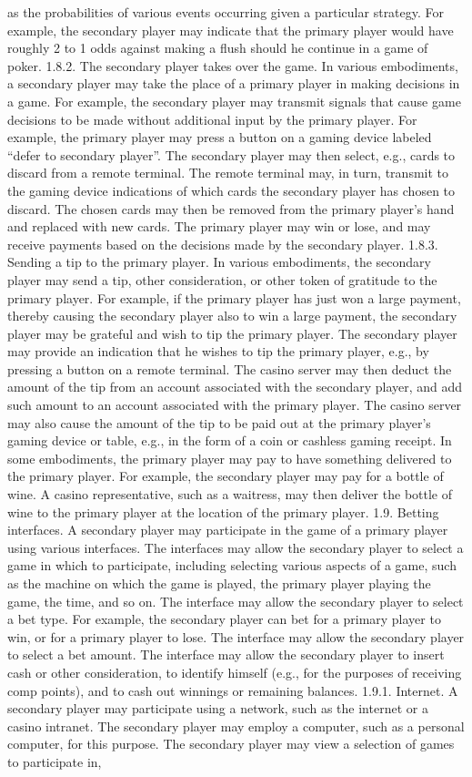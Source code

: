 \documentclass[11pt,a4paper]{article}
\begin{document}
as the probabilities of various events occurring given a particular strategy. For example, the secondary player may indicate that the primary player would have roughly 2 to 1 odds against making a flush should he continue in a game of poker. 1.8.2. The secondary player takes over the game. In various embodiments, a secondary player may take the place of a primary player in making decisions in a game. For example, the secondary player may transmit signals that cause game decisions to be made without additional input by the primary player. For example, the primary player may press a button on a gaming device labeled “defer to secondary player”. The secondary player may then select, e.g., cards to discard from a remote terminal. The remote terminal may, in turn, transmit to the gaming device indications of which cards the secondary player has chosen to discard. The chosen cards may then be removed from the primary player's hand and replaced with new cards. The primary player may win or lose, and may receive payments based on the decisions made by the secondary player. 1.8.3. Sending a tip to the primary player. In various embodiments, the secondary player may send a tip, other consideration, or other token of gratitude to the primary player. For example, if the primary player has just won a large payment, thereby causing the secondary player also to win a large payment, the secondary player may be grateful and wish to tip the primary player. The secondary player may provide an indication that he wishes to tip the primary player, e.g., by pressing a button on a remote terminal. The casino server may then deduct the amount of the tip from an account associated with the secondary player, and add such amount to an account associated with the primary player. The casino server may also cause the amount of the tip to be paid out at the primary player's gaming device or table, e.g., in the form of a coin or cashless gaming receipt. In some embodiments, the primary player may pay to have something delivered to the primary player. For example, the secondary player may pay for a bottle of wine. A casino representative, such as a waitress, may then deliver the bottle of wine to the primary player at the location of the primary player. 1.9. Betting interfaces. A secondary player may participate in the game of a primary player using various interfaces. The interfaces may allow the secondary player to select a game in which to participate, including selecting various aspects of a game, such as the machine on which the game is played, the primary player playing the game, the time, and so on. The interface may allow the secondary player to select a bet type. For example, the secondary player can bet for a primary player to win, or for a primary player to lose. The interface may allow the secondary player to select a bet amount. The interface may allow the secondary player to insert cash or other consideration, to identify himself (e.g., for the purposes of receiving comp points), and to cash out winnings or remaining balances. 1.9.1. Internet. A secondary player may participate using a network, such as the internet or a casino intranet. The secondary player may employ a computer, such as a personal computer, for this purpose. The secondary player may view a selection of games to participate in, 
\end{document}
